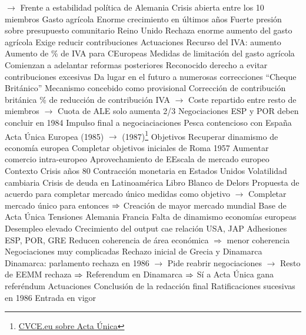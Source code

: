 \documentclass{nuevotema}
\begin{document}
\begin{esquemal}
				\4[] $\to$ Frente a estabilidad política de Alemania
				\4 Crisis abierta entre los 10 miembros
				\4 Gasto agrícola
				\4[] Enorme crecimiento en últimos años
				\4[] Fuerte presión sobre presupuesto comunitario
				\4 Reino Unido
				\4[] Rechaza enorme aumento del gasto agrícola
				\4[] Exige reducir contribuciones
			\3 Actuaciones
				\4 Recurso del IVA: aumento
				\4[] Aumento de \% de IVA para CEuropeas
				\4 Medidas de limitación del gasto agrícola
				\4[] Comienzan a adelantar reformas posteriores
				\4 Reconocido derecho a evitar contribuciones excesivas
				\4[] Da lugar en el futuro a numerosas correcciones
				\4 ``Cheque Británico''
				\4[] Mecanismo concebido como provisional
				\4[] Corrección de contribución británica
				\% de reducción de contribución IVA
				\4[] $\to$ Coste repartido entre resto de miembros
				\4[] $\to$ Cuota de ALE solo aumenta 2/3
				\4 Negociaciones ESP y POR deben concluir en 1984
				\4[] Impulso final a negociaciaciones
				\4[] Pesca contencioso con España
		\2 Acta Única Europea (1985) $\to$ (1987)\footnote{\href{https://www.cvce.eu/en/education/unit-content/-/unit/02bb76df-d066-4c08-a58a-d4686a3e68ff/c5c70c4a-898e-4eeb-96d2-94c7091dd293}{CVCE.eu sobre Acta Única}}
			\3 Objetivos
				\4 Recuperar dinamismo de economía europea
				\4 Completar objetivos iniciales de Roma 1957
				\4 Aumentar comercio intra-europeo
				\4 Aprovechamiento de EEscala de mercado europeo
			\3 Contexto
				\4 Crisis años 80
				\4[] Contracción monetaria en Estados Unidos
				\4[] Volatilidad cambiaria
				\4[] Crisis de deuda en Latinoamérica
				\4 Libro Blanco de Delors
				\4[] Propuesta de acuerdo para completar mercado único
				 medidas
				 como objetivo
				\4[] $\to$ Completar mercado único para entonces
				\4[] $\Rightarrow$ Creación de mayor mercado mundial
				\4[] Base de Acta Única
				\4 Tensiones Alemania Francia
				\4 Falta de dinamismo economías europeas
				\4[] Desempleo elevado
				\4[] Crecimiento del output cae relación USA, JAP
				\4 Adhesiones ESP, POR, GRE
				\4[] Reducen coherencia de área económica
				\4[] $\Rightarrow$ menor coherencia
				\4 Negociaciones muy complicadas
				\4 Rechazo inicial de Grecia y Dinamarca
				\4[] Dinamarca: parlamento rechaza en 1986
				\4[] $\to$ Pide reabrir negociaciones
				\4[] $\to$ Resto de EEMM rechaza
				\4[] $\Rightarrow$ Referendum en Dinamarca
				\4[] $\Rightarrow$ Sí a Acta Única gana referéndum
			\3 Actuaciones
				\4 Conclusión de la redacción final
				\4 Ratificaciones sucesivas en 1986
				\4 Entrada en vigor

\end{esquemal}
\end{document}
